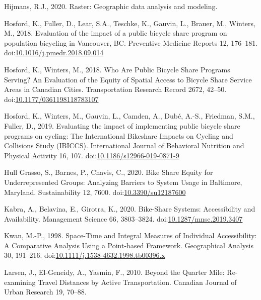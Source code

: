 \documentclass[]{elsarticle} %
\begin{document}
\leavevmode\hypertarget{ref-R-raster}{}%
Hijmans, R.J., 2020. Raster: Geographic data analysis and modeling.

\leavevmode\hypertarget{ref-hosfordEvaluationImpactPublic2018}{}%
Hosford, K., Fuller, D., Lear, S.A., Teschke, K., Gauvin, L., Brauer,
M., Winters, M., 2018. Evaluation of the impact of a public bicycle
share program on population bicycling in Vancouver, BC. Preventive
Medicine Reports 12, 176--181.
doi:\href{https://doi.org/10.1016/j.pmedr.2018.09.014}{10.1016/j.pmedr.2018.09.014}

\leavevmode\hypertarget{ref-hosfordWhoArePublic2018}{}%
Hosford, K., Winters, M., 2018. Who Are Public Bicycle Share Programs
Serving? An Evaluation of the Equity of Spatial Access to Bicycle Share
Service Areas in Canadian Cities. Transportation Research Record 2672,
42--50.
doi:\href{https://doi.org/10.1177/0361198118783107}{10.1177/0361198118783107}

\leavevmode\hypertarget{ref-hosfordEvaluatingImpactImplementing2019}{}%
Hosford, K., Winters, M., Gauvin, L., Camden, A., Dubé, A.-S., Friedman,
S.M., Fuller, D., 2019. Evaluating the impact of implementing public
bicycle share programs on cycling: The International Bikeshare Impacts
on Cycling and Collisions Study (IBICCS). International Journal of
Behavioral Nutrition and Physical Activity 16, 107.
doi:\href{https://doi.org/10.1186/s12966-019-0871-9}{10.1186/s12966-019-0871-9}

\leavevmode\hypertarget{ref-hullgrassoBikeShareEquity2020}{}%
Hull Grasso, S., Barnes, P., Chavis, C., 2020. Bike Share Equity for
Underrepresented Groups: Analyzing Barriers to System Usage in
Baltimore, Maryland. Sustainability 12, 7600.
doi:\href{https://doi.org/10.3390/su12187600}{10.3390/su12187600}

\leavevmode\hypertarget{ref-kabraBikeShareSystemsAccessibility2020}{}%
Kabra, A., Belavina, E., Girotra, K., 2020. Bike-Share Systems:
Accessibility and Availability. Management Science 66, 3803--3824.
doi:\href{https://doi.org/10.1287/mnsc.2019.3407}{10.1287/mnsc.2019.3407}

\leavevmode\hypertarget{ref-kwanSpaceTimeIntegral1998}{}%
Kwan, M.-P., 1998. Space-Time and Integral Measures of Individual
Accessibility: A Comparative Analysis Using a Point-based Framework.
Geographical Analysis 30, 191--216.
doi:\href{https://doi.org/10.1111/j.1538-4632.1998.tb00396.x}{10.1111/j.1538-4632.1998.tb00396.x}

\leavevmode\hypertarget{ref-larsenQuarterMileReexamining2010}{}%
Larsen, J., El-Geneidy, A., Yasmin, F., 2010. Beyond the Quarter Mile:
Re-examining Travel Distances by Active Transportation. Canadian Journal
of Urban Research 19, 70--88.
\end{document}
